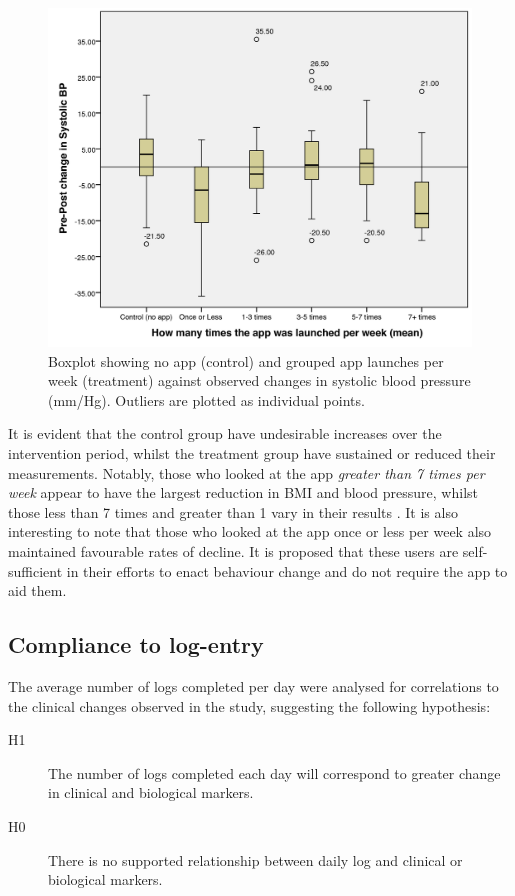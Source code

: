 \begin{figure}[h]
	\centering
    \includegraphics[scale=0.18, angle=0]{Files/prevention-study-3/figures/applaunch-bp}
  	\caption{Boxplot showing no app (control) and grouped app launches per week (treatment) against observed changes in systolic blood pressure (mm/Hg). Outliers are plotted as individual points.}
    \label{fig: applaunch-bp}
\end{figure}

It is evident that the control group have undesirable increases over the intervention period, whilst the treatment group have sustained or reduced their measurements. Notably, those who looked at the app \textit{greater than 7 times per week} appear to have the largest reduction in BMI and blood pressure, whilst those less than 7 times and greater than 1 vary in their results \cite{Hartin2015-JMIR}. It is also interesting to note that those who looked at the app once or less per week also maintained favourable rates of decline. It is proposed that these users are self-sufficient in their efforts to enact behaviour change and do not require the app to aid them.

\subsection{Compliance to log-entry}
The average number of logs completed per day were analysed for correlations to the clinical changes observed in the study, suggesting the following hypothesis:
\begin{description}
  \item[H1] The number of logs completed each day will correspond to greater change in clinical and biological markers.
  \item[H0] There is no supported relationship between daily log and clinical or biological markers.
\end{description}

